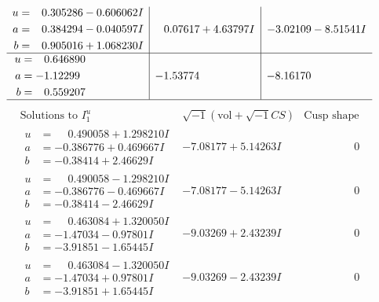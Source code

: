 \documentclass[1p]{elsarticle_modified}
\theoremstyle{definition}
\newcommand{\I}{\sqrt{-1}}
\begin{document}
$$\begin{array}{c|c|c}
\begin{aligned}
u &= \phantom{-}0.305286 - 0.606062 I \\
a &= \phantom{-}0.384294 - 0.040597 I \\
b &= \phantom{-}0.905016 + 1.068230 I\end{aligned}
 & \phantom{-}0.07617 + 4.63797 I & -3.02109 - 8.51541 I \\ \hline\begin{aligned}
u &= \phantom{-}0.646890\phantom{ +0.000000I} \\
a &= -1.12299\phantom{ +0.000000I} \\
b &= \phantom{-}0.559207\phantom{ +0.000000I}\end{aligned}
 & -1.53774\phantom{ +0.000000I} & -8.16170\phantom{ +0.000000I}\\
 \hline 
 \end{array}$$\newpage$$\begin{array}{c|c|c}  
\text{Solutions to }I^u_{1}& \I (\text{vol} + \sqrt{-1}CS) & \text{Cusp shape}\\
 \hline 
\begin{aligned}
u &= \phantom{-}0.490058 + 1.298210 I \\
a &= -0.386776 + 0.469667 I \\
b &= -0.38414 + 2.46629 I\end{aligned}
 & -7.08177 + 5.14263 I & \phantom{-0.000000 } 0 \\ \hline\begin{aligned}
u &= \phantom{-}0.490058 - 1.298210 I \\
a &= -0.386776 - 0.469667 I \\
b &= -0.38414 - 2.46629 I\end{aligned}
 & -7.08177 - 5.14263 I & \phantom{-0.000000 } 0 \\ \hline\begin{aligned}
u &= \phantom{-}0.463084 + 1.320050 I \\
a &= -1.47034 - 0.97801 I \\
b &= -3.91851 - 1.65445 I\end{aligned}
 & -9.03269 + 2.43239 I & \phantom{-0.000000 } 0 \\ \hline\begin{aligned}
u &= \phantom{-}0.463084 - 1.320050 I \\
a &= -1.47034 + 0.97801 I \\
b &= -3.91851 + 1.65445 I\end{aligned}
 & -9.03269 - 2.43239 I & \phantom{-0.000000 } 0 \\ \hline\begin{aligned}

\end{aligned}
\end{array}$$
\end{document}
